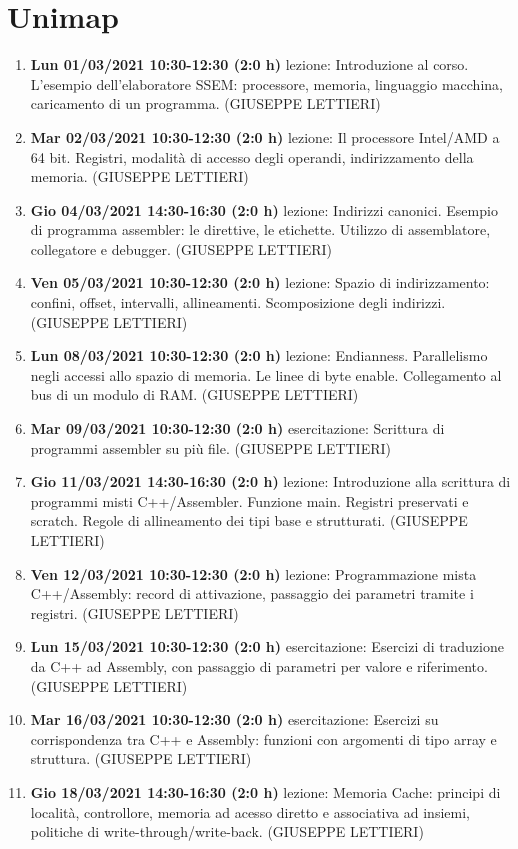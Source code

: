 \chapter{Unimap} 
\begin{enumerate}
	\item \textbf{Lun 01/03/2021 10:30-12:30 (2:0 h)} lezione: Introduzione al corso. L'esempio dell'elaboratore SSEM: processore, memoria, linguaggio macchina, caricamento di un programma. (GIUSEPPE LETTIERI)
	\item \textbf{Mar 02/03/2021 10:30-12:30 (2:0 h)} lezione: Il processore Intel/AMD a 64 bit. Registri, modalità di accesso degli operandi, indirizzamento della memoria. (GIUSEPPE LETTIERI)
	\item \textbf{Gio 04/03/2021 14:30-16:30 (2:0 h)} lezione: Indirizzi canonici. Esempio di programma assembler: le direttive, le etichette. Utilizzo di assemblatore, collegatore e debugger. (GIUSEPPE LETTIERI)
	\item \textbf{Ven 05/03/2021 10:30-12:30 (2:0 h)} lezione: Spazio di indirizzamento: confini, offset, intervalli, allineamenti. Scomposizione degli indirizzi. (GIUSEPPE LETTIERI)
	\item \textbf{Lun 08/03/2021 10:30-12:30 (2:0 h)} lezione: Endianness. Parallelismo negli accessi allo spazio di memoria. Le linee di byte enable. Collegamento al bus di un modulo di RAM. (GIUSEPPE LETTIERI)
	\item \textbf{Mar 09/03/2021 10:30-12:30 (2:0 h)} esercitazione: Scrittura di programmi assembler su più file. (GIUSEPPE LETTIERI)
	\item \textbf{Gio 11/03/2021 14:30-16:30 (2:0 h)} lezione: Introduzione alla scrittura di programmi misti C++/Assembler. Funzione main. Registri preservati e scratch. Regole di allineamento dei tipi base e strutturati. (GIUSEPPE LETTIERI)
	\item \textbf{Ven 12/03/2021 10:30-12:30 (2:0 h)} lezione: Programmazione mista C++/Assembly: record di attivazione, passaggio dei parametri tramite i registri. (GIUSEPPE LETTIERI)
	\item \textbf{Lun 15/03/2021 10:30-12:30 (2:0 h)} esercitazione: Esercizi di traduzione da C++ ad Assembly, con passaggio di parametri per valore e riferimento. (GIUSEPPE LETTIERI)
	\item \textbf{Mar 16/03/2021 10:30-12:30 (2:0 h)} esercitazione: Esercizi su corrispondenza tra C++ e Assembly: funzioni con argomenti di tipo array e struttura. (GIUSEPPE LETTIERI)
	\item \textbf{Gio 18/03/2021 14:30-16:30 (2:0 h)} lezione: Memoria Cache: principi di località, controllore, memoria ad acesso diretto e associativa ad insiemi, politiche di write-through/write-back. (GIUSEPPE LETTIERI)

\end{enumerate}
